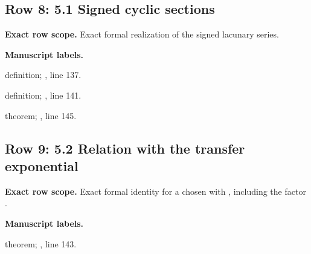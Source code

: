 \subsection{Row 8: 5.1 Signed cyclic sections}
\label{row:8}
\textbf{Exact row scope.} Exact formal realization of the signed lacunary series.\par\smallskip
\textbf{Manuscript labels.} \par\smallskip
{\small{}\par}
{\footnotesize\color{muted}definition; , line 137.\par}\smallskip
{\small{}\par}
{\footnotesize\color{muted}definition; , line 141.\par}\smallskip
{\small{}\par}
{\footnotesize\color{muted}theorem; , line 145.\par}\smallskip
{}
\subsection{Row 9: 5.2 Relation with the transfer exponential}
\label{row:9}
\textbf{Exact row scope.} Exact formal identity for a chosen  with , including the factor .\par\smallskip
\textbf{Manuscript labels.} \par\smallskip
{\small{}\par}
{\footnotesize\color{muted}theorem; , line 143.\par}\smallskip
{}
